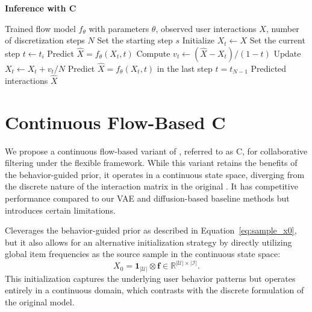 \documentclass[sigconf]{acmart}
\begin{document}


\appendix

\begin{algorithm}[H]
	\caption{\textbf{Inference with C\ours}}  
	\begin{algorithmic}[1]
		\Require Trained flow model $f_\theta$ with parameters $\theta$, observed user interactions $X$, number of discretization steps $N$
        \State Set the starting step $s$ 
        \State Initialize $X_t \gets X$
        	\State Set the current step $t \gets t_i$
            \State Predict $\hat{X} = f_\theta(X_t, t)$ 
            \State Compute $v_t \gets (\hat{X} - X_t) / (1 - t)$
            \State Update $X_t \gets X_t + v_t / N$
        \EndFor
        \State Predict $\hat X = f_\theta(X_t, t)$ in the last step $t = t_{N-1}$
        \Ensure Predicted interactions $\hat X$
	\end{algorithmic}
    \label{alg:inference_cflowcf}
\end{algorithm}

\section{Continuous Flow-Based C\ours}
\label{sec:cflowcf}
We propose a continuous flow-based variant of \ours, referred to as C\ours, for collaborative filtering under the flexible \ours framework. While this variant retains the benefits of the behavior-guided prior, it operates in a continuous state space, diverging from the discrete nature of the interaction matrix in the original \ours. It has competitive performance compared to our VAE and diffusion-based baseline methods but introduces certain limitations.

C\ours leverages the behavior-guided prior as described in Equation~\ref{eq:sample_x0}, but it also allows for an alternative initialization strategy by directly utilizing global item frequencies as the source sample in the continuous state space:
\begin{equation*}
X_0 = \mathbf 1_{|\mathcal U|} \otimes \mathbf f \in \mathbb R^{|\mathcal U| \times |\mathcal I|}.
\end{equation*}
This initialization captures the underlying user behavior patterns but operates entirely in a continuous domain, which contrasts with the discrete formulation of the original \ours model.
\end{document}
